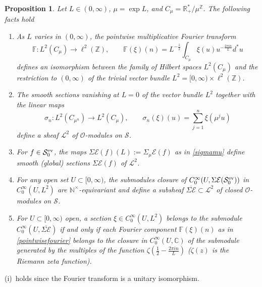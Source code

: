 \documentclass{pspum-l}
\newtheorem{proposition}[theorem]{Proposition}
\theoremstyle{definition}
\theoremstyle{remark}
\numberwithin{equation}{section}
\def\C{{\mathbb C}}
\def\F{{\mathbb F}}
\def\R{{\mathbb R}}
\def\Z{{\mathbb Z}}
\def\cE{{\mathcal E}}
\def\cL{{\mathcal L}}
\def\cO{{\mathcal O}}
\def\cS{{\mathcal S}}
\def\fourier{\F}
\def\sr0{{\cS^{\rm ev}_0}}
\def\nt{\N^{\times}}
\def\N{{\mathbb N}}
\def\scal2{{\mathscr S}}
\begin{document}
 \begin{proposition}\label{sheaves}
Let $L\in (0,\infty)$, $\mu=\exp L$, and $C_\mu=\R^*_+/\mu^\Z$. The following facts hold
 \begin{enumerate}
 \item[(i)] As $L$ varies in $(0,\infty)$, the pointwise multiplicative Fourier transform
 \begin{equation}\label{pointwisefourier}
	 \fourier:L^2(C_\mu)\to \ell^2(\Z), \qquad \fourier(\xi)(n)=L^{-\frac 12}\int_{C_\mu} \xi(u)u^{-\frac{2\pi i n}{L}}d^*u 
\end{equation}
defines an isomorphism between the family of Hilbert spaces $L^2(C_\mu)$  and the restriction to $(0,\infty)$ of the  trivial vector bundle $L^2=[0,\infty)\times \ell^2(\Z)$.
 \item[(ii)] The smooth sections  vanishing at $L=0$ of the vector bundle $L^2$   together with the linear maps 
 \begin{equation}\label{sigman}
 \sigma_n:L^2(C_{\mu^n})\to L^2(C_\mu), \qquad \sigma_n(\xi)(u)=\sum_{j=1}^n \xi(\mu^j u)
 \end{equation}
 define a  sheaf  $\cL^2$ of $\cO$-modules on $\scal2$.
 \item[(iii)] For $f\in \sr0$, the maps $\Sigma\cE(f)(L):= \Sigma_{\mu}\cE(f)$  as in \eqref{sigmamu} define  smooth (global) sections $\Sigma\cE(f)$ of  $\cL^2$. 
 \item[(iv)] For any open set $U\subset [0,\infty)$, the  submodules    closure of  $C_0^{\infty}(U,\Sigma\cE(\sr0))$ in $ C_0^{\infty}(U,L^2)$ are $\nt$-equivariant and  define a subsheaf $\overline{\Sigma\cE}\subset \cL^2$ of closed $\cO$-modules on $\scal2$.
 \item[(v)] For $U\subset [0,\infty)$ open, a section $\xi\in C^\infty_0(U, L^2)$ belongs to the submodule 	$C_0^{\infty}(U,\overline{\Sigma\cE})$ if and only if each Fourier component $\fourier(\xi)(n)$ as in \eqref{pointwisefourier} belongs to the closure in $C_0^{\infty}(U,\C)$ of the submodule generated by the multiples of the function $\zeta\left(\frac 12-\frac{2\pi i n}{L}\right)$  ($\zeta(z)$ is the Riemann zeta function).
 \end{enumerate}
 \end{proposition}
 
 \proof (i)~holds since the Fourier transform is  a unitary isomorphism. 
\end{document}
